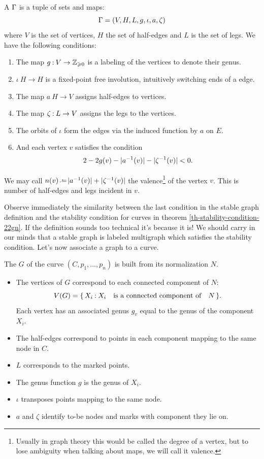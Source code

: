 \documentclass[12pt]{memoir}
\begin{document}
\begin{Def}
A  $\Gamma$ is a tuple of sets and maps:
$$\Gamma=(V,H,L,g,\iota,a,\zeta)$$
where $V$ is the set of vertices, $H$ the set of half-edges and $L$ is the set of legs. We have the following conditions:
\begin{enumerate}
    \item The map $g\mathbin{:} V\to\mathbb{Z}_{\geqslant 0}$ is a labeling of the vertices to denote their genus.
    \item $\iota\: H\to H$ is a fixed-point free involution, intuitively switching ends of a edge.
    \item The map $a\: H\to V$ assigns half-edges to vertices.
    \item The map $\zeta\mathbin{:} L\to V$ assigns the legs to the vertices.
    \item The orbits of $\iota$ form the edges via the induced function by $a$ on $E$.
    \item And each vertex $v$ satisfies the condition
    $$2-2g(v)-\lvert a^{-1}(v)\rvert-\lvert \zeta^{-1}(v)\rvert<0.$$
\end{enumerate}    
We may call $n(v)\defeq\lvert a^{-1}(v)\rvert+\lvert \ze^{-1}(v)\rvert$ the valence\footnote{Usually in graph theory this would be called the degree of a vertex, but to lose ambiguity when talking about maps, we will call it valence.} of the vertex $v$. This is number of half-edges and legs incident in $v$. 
\end{Def}

Observe immediately the similarity between the last condition in the stable graph definition and the stability condition for curves in theorem \ref{th-stability-condition-22gn}. 
If the definition sounds too technical it's because it is! We should carry in our minds that a stable graph is labeled multigraph which satisfies the stability condition. Let's now associate a graph to a curve.

\begin{Def}
    The  $G$ of the curve $(C,
p_1,\dots,p_n)$ is built from its normalization $N$. 
\begin{itemize}
    \item The vertices of $G$ correspond to each connected component of $N$:
    $$V(G)=\{\,X_i\mathbin{:} X_i\quad\text{is a connected component of}\quad N\,\}.$$
    Each vertex has an associated genus $g_v$ equal to the genus of the component $X_i$.
    \item The half-edges correspond to points in each component mapping to the same node in $C$.
    \item $L$ corresponds to the marked points.
    \item The genus function $g$ is the genus of $X_i$.
    \item $\iota$ transposes points mapping to the same node.
    \item $a$ and $\zeta$ identify to-be nodes and marks with component they lie on.
\end{itemize}
\end{Def}
\end{document}
